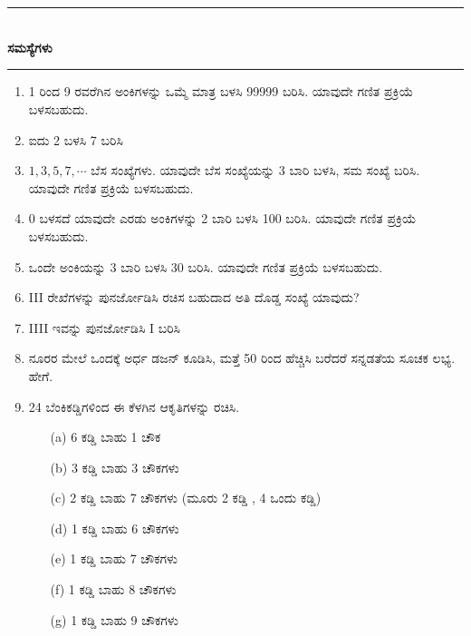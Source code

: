 \chapter[ಅಧ್ಯಾಯ 6]{}\label{chap6}

\begin{center}
\rule{5cm}{1pt}\\[5pt]
{\Large\bfseries ಸಮಸ್ಯೆಗಳು}\\[3pt]
\rule{5cm}{1pt}
\end{center}

\begin{enumerate}
\renewcommand{\labelenumi}{\bf\theenumi.}
\itemsep=5pt

\item 1 ರಿಂದ 9 ರವರೆಗಿನ ಅಂಕಿಗಳನ್ನು ಒಮ್ಮೆ ಮಾತ್ರ ಬಳಸಿ 99999 ಬರಿಸಿ. ಯಾವುದೇ ಗಣಿತ ಪ್ರಕ್ರಿಯೆ ಬಳಸಬಹುದು. 

\item ಐದು 2 ಬಳಸಿ 7 ಬರಿಸಿ 

\item $1, 3, 5, 7, \cdots$ ಬೆಸ ಸಂಖ್ಯೆಗಳು. ಯಾವುದೇ ಬೆಸ ಸಂಖ್ಯೆಯನ್ನು 3 ಬಾರಿ ಬಳಸಿ, ಸಮ ಸಂಖ್ಯೆ ಬರಿಸಿ. ಯಾವುದೇ ಗಣಿತ ಪ್ರಕ್ರಿಯೆ ಬಳಸಬಹುದು. 

\item 0 ಬಳಸದೆ ಯಾವುದೇ ಎರಡು ಅಂಕಿಗಳನ್ನು 2 ಬಾರಿ ಬಳಸಿ 100 ಬರಿಸಿ. ಯಾವುದೇ ಗಣಿತ ಪ್ರಕ್ರಿಯೆ ಬಳಸಬಹುದು. 

\item ಒಂದೇ ಅಂಕಿಯನ್ನು 3 ಬಾರಿ ಬಳಸಿ 30 ಬರಿಸಿ. ಯಾವುದೇ ಗಣಿತ ಪ್ರಕ್ರಿಯೆ ಬಳಸಬಹುದು. 

\item III ರೇಖೆಗಳನ್ನು ಪುನರ್ಜೋಡಿಸಿ ರಚಿಸ ಬಹುದಾದ ಅತಿ ದೊಡ್ಡ ಸಂಖ್ಯೆ ಯಾವುದು? 

\item IIII ಇವನ್ನು ಪುನರ್ಜೋಡಿಸಿ I ಬರಿಸಿ 

\item ನೂರರ ಮೇಲೆ ಒಂದಕ್ಕೆ ಅರ್ಧ ಡಜನ್ ಕೂಡಿಸಿ, ಮತ್ತೆ 50 ರಿಂದ ಹೆಚ್ಚಿಸಿ ಬರೆದರೆ ಸನ್ನಡತೆಯ ಸೂಚಕ ಲಭ್ಯ. ಹೇಗೆ. 

\item  24 ಬೆಂಕಿಕಡ್ಡಿಗಳಿಂದ ಈ ಕೆಳಗಿನ ಆಕೃತಿಗಳನ್ನು ರಚಿಸಿ. 
\begin{itemize}
\item [(a)] 6 ಕಡ್ಡಿ ಬಾಹು 1 ಚೌಕ
\item [(b)] 3 ಕಡ್ಡಿ ಬಾಹು 3 ಚೌಕಗಳು  
\item [(c)]2 ಕಡ್ಡಿ ಬಾಹು 7 ಚೌಕಗಳು (ಮೂರು 2 ಕಡ್ಡಿ , 4 ಒಂದು ಕಡ್ಡಿ)
\item [(d)]1 ಕಡ್ಡಿ ಬಾಹು 6 ಚೌಕಗಳು  
\item [(e)]1 ಕಡ್ಡಿ ಬಾಹು 7 ಚೌಕಗಳು  
\item [(f)]1 ಕಡ್ಡಿ ಬಾಹು 8 ಚೌಕಗಳು 
\item [(g)]1 ಕಡ್ಡಿ ಬಾಹು 9 ಚೌಕಗಳು 
\end{itemize}


\end{enumerate}
